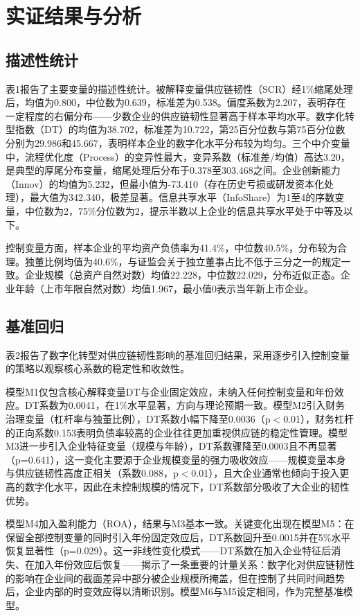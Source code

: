\section{实证结果与分析}

\subsection{描述性统计}

表1报告了主要变量的描述性统计。被解释变量供应链韧性（SCR）经1\%缩尾处理后，均值为0.800，中位数为0.639，标准差为0.538。偏度系数为2.207，表明存在一定程度的右偏分布——少数企业的供应链韧性显著高于样本平均水平。数字化转型指数（DT）的均值为38.702，标准差为10.722，第25百分位数与第75百分位数分别为29.986和45.667，表明样本企业的数字化水平分布较为均匀。三个中介变量中，流程优化度（Process）的变异性最大，变异系数（标准差/均值）高达3.20，是典型的厚尾分布变量，缩尾处理后分布于0.378至303.468之间。企业创新能力（Innov）的均值为5.232，但最小值为-73.410（存在历史亏损或研发资本化处理），最大值为342.340，极差显著。信息共享水平（InfoShare）为1至4的序数变量，中位数为2，75\%分位数为2，提示半数以上企业的信息共享水平处于中等及以下。

控制变量方面，样本企业的平均资产负债率为41.4\%，中位数40.5\%，分布较为合理。独董比例均值为40.6\%，与证监会关于独立董事占比不低于三分之一的规定一致。企业规模（总资产自然对数）均值22.228，中位数22.029，分布近似正态。企业年龄（上市年限自然对数）均值1.967，最小值0表示当年新上市企业。


\FloatBarrier

\subsection{基准回归}

表2报告了数字化转型对供应链韧性影响的基准回归结果，采用逐步引入控制变量的策略以观察核心系数的稳定性和收敛性。

模型M1仅包含核心解释变量DT与企业固定效应，未纳入任何控制变量和年份效应。DT系数为0.0041，在1\%水平显著，方向与理论预期一致。模型M2引入财务治理变量（杠杆率与独董比例），DT系数小幅下降至0.0036（p$<$0.01），财务杠杆的正向系数0.153表明负债率较高的企业往往更加重视供应链的稳定性管理。模型M3进一步引入企业特征变量（规模与年龄），DT系数骤降至0.0003且不再显著（p=0.641），这一变化主要源于企业规模变量的强力吸收效应——规模变量本身与供应链韧性高度正相关（系数0.088，p$<$0.01），且大企业通常也倾向于投入更高的数字化水平，因此在未控制规模的情况下，DT系数部分吸收了大企业的韧性优势。

模型M4加入盈利能力（ROA），结果与M3基本一致。关键变化出现在模型M5：在保留全部控制变量的同时引入年份固定效应后，DT系数回升至0.0015并在5\%水平恢复显著性（p=0.029）。这一非线性变化模式——DT系数在加入企业特征后消失、在加入年份效应后恢复——揭示了一条重要的计量关系：数字化对供应链韧性的影响在企业间的截面差异中部分被企业规模所掩盖，但在控制了共同时间趋势后，企业内部的时变效应得以清晰识别。模型M6与M5设定相同，作为完整基准模型。

